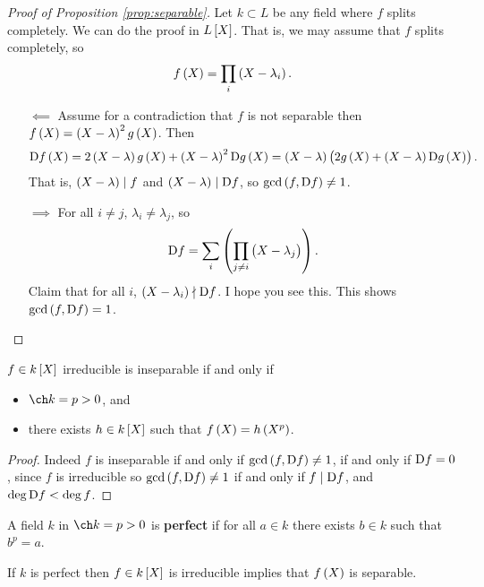 \begin{proof}[Proof of Proposition \ref{prop:separable}]
Let $ k \subset L $ be any field where $ f $ splits completely. We can do the proof in $ L\sbr{X} $. That is, we may assume that $ f $ splits completely, so
$$ f\br{X} = \prod_i \br{X - \lambda_i}. $$
\begin{itemize}
\item[$ \impliedby $] Assume for a contradiction that $ f $ is not separable then $ f\br{X} = \br{X - \lambda}^2g\br{X} $. Then
$$ \D f\br{X} = 2\br{X - \lambda}g\br{X} + \br{X - \lambda}^2\D g\br{X} = \br{X - \lambda}\br{2g\br{X} + \br{X - \lambda}\D g\br{X}}. $$
That is, $ \br{X - \lambda} \mid f $ and $ \br{X - \lambda} \mid \D f $, so $ \gcd\br{f, \D f} \ne 1 $.
\item[$ \implies $] For all $ i \ne j $, $ \lambda_i \ne \lambda_j $, so
$$ \D f = \sum_i \br{\prod_{j \ne i} \br{X - \lambda_j}}. $$
Claim that for all $ i $, $ \br{X - \lambda_i} \nmid \D f $. I hope you see this. This shows $ \gcd\br{f, \D f} = 1 $.
\end{itemize}
\end{proof}

\begin{theorem}
$ f \in k\sbr{X} $ irreducible is inseparable if and only if
\begin{itemize}
\item $ \ch k = p > 0 $, and
\item there exists $ h \in k\sbr{X} $ such that $ f\br{X} = h\br{X^p} $.
\end{itemize}
\end{theorem}

\begin{proof}
Indeed $ f $ is inseparable if and only if $ \gcd\br{f, \D f} \ne 1 $, if and only if $ \mathrm{D} f = 0 $, since $ f $ is irreducible so $ \gcd\br{f, \D f} \ne 1 $ if and only if $ f \mid \mathrm{D} f $, and $ \deg \mathrm{D} f < \deg f $.
\end{proof}

\pagebreak

\begin{definition}
A field $ k $ in $ \ch k = p > 0 $ is \textbf{perfect} if for all $ a \in k $ there exists $ b \in k $ such that $ b^p = a $.
\end{definition}

\begin{proposition}
If $ k $ is perfect then $ f \in k\sbr{X} $ is irreducible implies that $ f\br{X} $ is separable.
\end{proposition}

